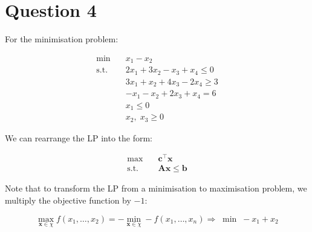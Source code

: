 \documentclass[12pt]{article}
\begin{document}
    
    
    
    
    


\newpage

\newpage

\section*{Question 4}
For the minimisation problem: 

\begin{align}
    \nonumber \min \quad & x_{1}-x_{2} \\
    \text{s.t.} \quad & 2 x_{1} + 3 x_{2} - x_{3} + x_{4} \leq 0 \\ 
    & 3 x_{1} + x_{2} + 4 x_{3} - 2 x_{4} \geq 3 \\ 
    & - x_{1} - x_{2} + 2 x_{3} + x_{4} = 6 \\ 
    & x_{1} \leq 0 \\ 
    & x_{2},\; x_{3} \geq 0 
\end{align}

\noindent We can rearrange the LP into the form: 

\begin{align*}
    \max \quad & \mathbf{c}^{\top} \mathbf{x} \\ 
    \text{s.t.} \quad & \mathbf{A} \mathbf{x} \leq \mathbf{b}
\end{align*}

\noindent Note that to transform the LP from a minimisation to maximisation problem, we multiply the objective function by $-1$:

\begin{equation*}
    \max_{\mathbf{x}\in \chi} f(x_1, \dots, x_2) = - \min_{\mathbf{x}\in \chi} -f(x_1, \dots, x_n) \Longrightarrow \; \min \; -x_1 + x_2
\end{equation*}
\end{document}
